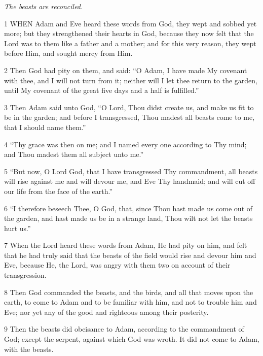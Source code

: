 \par \textit{The beasts are reconciled.}

\par 1 WHEN Adam and Eve heard these words from God, they wept and sobbed yet more; but they strengthened their hearts in God, because they now felt that the Lord was to them like a father and a mother; and for this very reason, they wept before Him, and sought mercy from Him.

\par 2 Then God had pity on them, and said: “O Adam, I have made My covenant with thee, and I will not turn from it; neither will I let thee return to the garden, until My covenant of the great five days and a half is fulfilled.”

\par 3 Then Adam said unto God, “O Lord, Thou didst create us, and make us fit to be in the garden; and before I transgressed, Thou madest all beasts come to me, that I should name them.”

\par 4 “Thy grace was then on me; and I named every one according to Thy mind; and Thou madest them all subject unto me.”

\par 5 “But now, O Lord God, that I have transgressed Thy commandment, all beasts will rise against me and will devour me, and Eve Thy handmaid; and will cut off our life from the face of the earth.”

\par 6 “I therefore beseech Thee, O God, that, since Thou hast made us come out of the garden, and hast made us be in a strange land, Thou wilt not let the beasts hurt us.”

\par 7 When the Lord heard these words from Adam, He had pity on him, and felt that he had truly said that the beasts of the field would rise and devour him and Eve, because He, the Lord, was angry with them two on account of their transgression.

\par 8 Then God commanded the beasts, and the birds, and all that moves upon the earth, to come to Adam and to be familiar with him, and not to trouble him and Eve; nor yet any of the good and righteous among their posterity.

\par 9 Then the beasts did obeisance to Adam, according to the commandment of God; except the serpent, against which God was wroth. It did not come to Adam, with the beasts.

